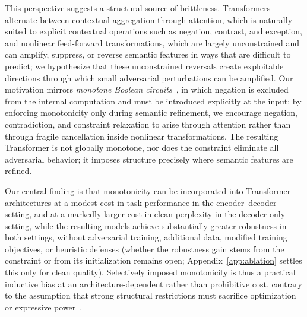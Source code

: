 \documentclass{article}
\theoremstyle{plain}
\theoremstyle{definition}
\theoremstyle{remark}
\theoremstyle{plain}
\begin{document}
This perspective suggests a structural source of brittleness. Transformers alternate between contextual aggregation through attention, which is naturally suited to explicit contextual operations such as negation, contrast, and exception, and nonlinear feed-forward transformations, which are largely unconstrained and can amplify, suppress, or reverse semantic features in ways that are difficult to predict; we hypothesize that these unconstrained reversals create exploitable directions through which small adversarial perturbations can be amplified. Our motivation mirrors \emph{monotone Boolean circuits}~\citep{jukna2012boolean}, in which negation is excluded from the internal computation and must be introduced explicitly at the input: by enforcing monotonicity only during semantic refinement, we encourage negation, contradiction, and constraint relaxation to arise through attention rather than through fragile cancellation inside nonlinear transformations. The resulting Transformer is not globally monotone, nor does the constraint eliminate all adversarial behavior; it imposes structure precisely where semantic features are refined.

Our central finding is that monotonicity can be incorporated into Transformer architectures at a modest cost in task performance in the encoder--decoder setting, and at a markedly larger cost in clean perplexity in the decoder-only setting, while the resulting models achieve substantially greater robustness in both settings, without adversarial training, additional data, modified training objectives, or heuristic defenses (whether the robustness gain stems from the constraint or from its initialization remains open; Appendix~\ref{app:ablation} settles this only for clean quality). Selectively imposed monotonicity is thus a practical inductive bias at an architecture-dependent rather than prohibitive cost, contrary to the assumption that strong structural restrictions must sacrifice optimization or expressive power~\citep[see][]{sartor2025advancing}.
\end{document}
